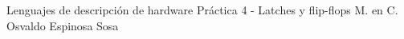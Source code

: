 




	\pnormal
	{Lenguajes de descripción de hardware}
	{Práctica 4  - Latches y flip-flops}
	{M. en C. Osvaldo Espinosa Sosa}
	\tableofcontents
	
	\newpage 
	\newpage 
	\clearpage 
	\clearpage 
	\clearpage 
	\clearpage 
	\newpage 



